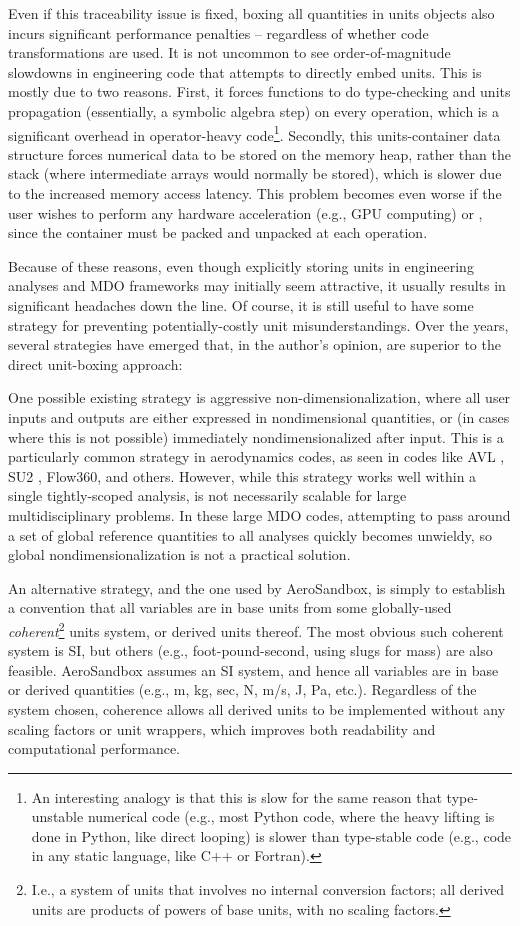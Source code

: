 Even if this traceability issue is fixed, boxing all quantities in units objects also incurs significant performance penalties -- regardless of whether code transformations are used. It is not uncommon to see order-of-magnitude slowdowns in engineering code that attempts to directly embed units. This is mostly due to two reasons. First, it forces functions to do type-checking and units propagation (essentially, a symbolic algebra step) on every operation, which is a significant overhead in operator-heavy code\footnote{An interesting analogy is that this is slow for the same reason that type-unstable numerical code (e.g., most Python code, where the heavy lifting is done in Python, like direct looping) is slower than type-stable code (e.g., code in any static language, like C++ or Fortran).}. Secondly, this units-container data structure forces numerical data to be stored on the memory heap, rather than the stack (where intermediate arrays would normally be stored), which is slower due to the increased memory access latency. This problem becomes even worse if the user wishes to perform any hardware acceleration (e.g., GPU computing) or , since the container must be packed and unpacked at each operation.

Because of these reasons, even though explicitly storing units in engineering analyses and MDO frameworks may initially seem attractive, it usually results in significant headaches down the line. Of course, it is still useful to have some strategy for preventing potentially-costly unit misunderstandings. Over the years, several strategies have emerged that, in the author's opinion, are superior to the direct unit-boxing approach:

One possible existing strategy is aggressive non-dimensionalization, where all user inputs and outputs are either expressed in nondimensional quantities, or (in cases where this is not possible) immediately nondimensionalized after input. This is a particularly common strategy in aerodynamics codes, as seen in codes like AVL \cite{avl}, SU2 \cite{economon_su2_2016}, Flow360, and others. However, while this strategy works well within a single tightly-scoped analysis, is not necessarily scalable for large multidisciplinary problems. In these large MDO codes, attempting to pass around a set of global reference quantities to all analyses quickly becomes unwieldy, so global nondimensionalization is not a practical solution.

An alternative strategy, and the one used by AeroSandbox, is simply to establish a convention that all variables are in base units from some globally-used \emph{coherent}\footnote{I.e., a system of units that involves no internal conversion factors; all derived units are products of powers of base units, with no scaling factors.} units system, or derived units thereof. The most obvious such coherent system is SI, but others (e.g., foot-pound-second, using slugs for mass) are also feasible. AeroSandbox assumes an SI system, and hence all variables are in base or derived quantities (e.g., m, kg, sec, N, m/s, J, Pa, etc.). Regardless of the system chosen, coherence allows all derived units to be implemented without any scaling factors or unit wrappers, which improves both readability and computational performance.

